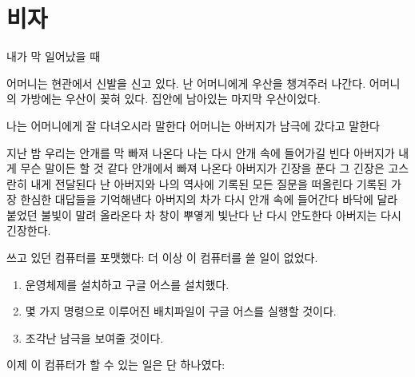 \hypertarget{uxbe44uxc790}{%

\chapter{비자}\label{uxbe44uxc790}}



내가 막 일어났을 때



어머니는 현관에서 신발을 신고 있다. 난 어머니에게 우산을 챙겨주러 나간다. 어머니의 가방에는 우산이 꽂혀 있다. 집안에 남아있는 마지막 우산이었다.



나는 어머니에게 잘 다녀오시라 말한다 어머니는 아버지가 남극에 갔다고 말한다



지난 밤 우리는 안개를 막 빠져 나온다 나는 다시 안개 속에 들어가길 빈다 아버지가 내게 무슨 말이든 할 것 같다 안개에서 빠져 나온다 아버지가 긴장을 푼다 그 긴장은 고스란히 내게 전달된다 난 아버지와 나의 역사에 기록된 모든 질문을 떠올린다 기록된 가장 한심한 대답들을 기억해낸다 아버지의 차가 다시 안개 속에 들어간다 바닥에 달라 붙었던 불빛이 말려 올라온다 차 창이 뿌옇게 빛난다 난 다시 안도한다 아버지는 다시 긴장한다.



쓰고 있던 컴퓨터를 포맷했다: 더 이상 이 컴퓨터를 쓸 일이 없었다.



\begin{enumerate}

\def\labelenumi{\arabic{enumi}.}

\tightlist

\item

  운영체제를 설치하고 구글 어스를 설치했다.

\item

  몇 가지 명령으로 이루어진 배치파일이 구글 어스를 실행할 것이다.

\item

  조각난 남극을 보여줄 것이다.

\end{enumerate}



이제 이 컴퓨터가 할 수 있는 일은 단 하나였다:




